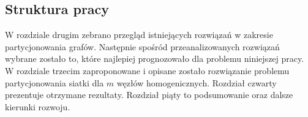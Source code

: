 \subsection{Struktura pracy}

W rozdziale drugim zebrano przegląd istniejących rozwiązań w zakresie partycjonowania grafów.
Następnie spośród przeanalizowanych rozwiązań wybrane zostało to, które najlepiej prognozowało dla
problemu niniejszej pracy.
W rozdziale trzecim zaproponowane i opisane zostało rozwiązanie problemu partycjonowania siatki dla
$m$ węzłów homogenicznych.
Rozdział czwarty prezentuje otrzymane rezultaty.
Rozdział piąty to podsumowanie oraz dalsze kierunki rozwoju.